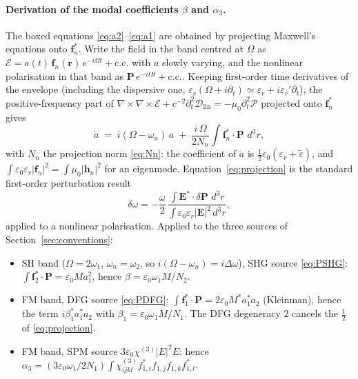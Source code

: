 \documentclass[11pt,a4paper]{article}
\newcommand{\eps}{\varepsilon}
\newcommand{\epstilde}{\widetilde{\varepsilon}}
\newcommand{\bvec}[1]{\mathbf{#1}}
\newcommand{\f}{\bvec{f}}
\newcommand{\h}{\bvec{h}}
\newcommand{\ri}{\bvec{r}}
\newcommand{\dthreer}{\,d^{3}r}
\newcommand{\chithree}{\chi^{(3)}}
\newcommand{\Dom}{\Delta\omega}
\begin{document}
\paragraph{Derivation of the modal coefficients $\beta$ and $\alpha_3$.}
The boxed equations \eqref{eq:a2}--\eqref{eq:a1} are obtained by
projecting Maxwell's equations onto $\f_n^*$.  Write the field in the
band centred at $\Omega$ as $\mathcal E=a(t)\,\f_n(\ri)\,e^{-i\Omega t}+\text{c.c.}$
with $a$ slowly varying, and the nonlinear polarisation in that band as
$\mathbf P\,e^{-i\Omega t}+\text{c.c.}$.  Keeping first-order time
derivatives of the envelope (including the dispersive one,
$\eps_r(\Omega+i\partial_t)\simeq\eps_r+i\eps_r'\partial_t$), the
positive-frequency part of
$\nabla\!\times\!\nabla\!\times\mathcal E+c^{-2}\partial_t^2\mathcal D_\text{lin}=-\mu_0\partial_t^2\mathcal P$
projected onto $\f_n^*$ gives
\begin{equation}
  \dot a\;=\;i(\Omega-\omega_n)\,a\;+\;\frac{i\,\Omega}{2N_n}\!\int\!\f_n^*\!\cdot\mathbf P\,\dthreer ,
  \label{eq:projection}
\end{equation}
with $N_n$ the projection norm \eqref{eq:Nn}: the coefficient of
$\dot a$ is $\tfrac12\eps_0(\eps_r+\epstilde)$, and
$\int\eps_0\eps_r|\f_n|^2=\int\mu_0|\h_n|^2$ for an eigenmode.
Equation~\eqref{eq:projection} is the standard first-order perturbation
result~\cite{Johnson2002}
\begin{equation*}
  \delta\omega=-\frac{\omega}{2}\,
  \frac{\int\mathbf E^*\!\cdot\delta\mathbf P\,\dthreer}{\int\eps_0\eps_r|\mathbf E|^2\dthreer},
\end{equation*}
applied to a nonlinear polarisation.  Applied to the three sources of
Section~\ref{sec:conventions}:
\begin{itemize}\setlength{\itemsep}{2pt}
  \item SH band ($\Omega=2\omega_1$, $\omega_n=\omega_2$, so
    $i(\Omega-\omega_n)=i\Dom$), SHG source \eqref{eq:PSHG}:
    $\int\f_2^*\!\cdot\mathbf P=\eps_0Ma_1^2$, hence $\beta=\eps_0\omega_1M/N_2$.
  \item FM band, DFG source \eqref{eq:PDFG}:
    $\int\f_1^*\!\cdot\mathbf P=2\eps_0M^*a_1^*a_2$ (Kleinman), hence the
    term $i\beta_1^*a_1^*a_2$ with $\beta_1=\eps_0\omega_1M/N_1$.  The DFG
    degeneracy $2$ cancels the $\tfrac12$ of \eqref{eq:projection}.
  \item FM band, SPM source $3\eps_0\chithree|E|^2E$: hence
    $\alpha_3=(3\eps_0\omega_1/2N_1)\int\chithree_{ijkl}f_{1,i}^*f_{1,j}f_{1,k}f_{1,l}^*$.
\end{itemize}
\end{document}
